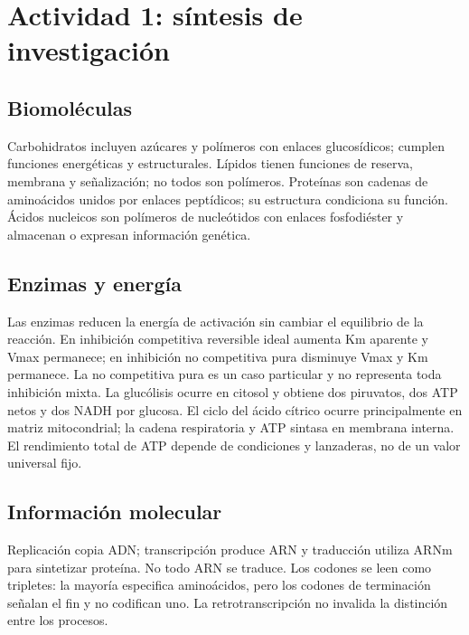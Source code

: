 \def\uadectitulo{Bioquímica y biología molecular}


\portadaUAdeC
\section{Actividad 1: síntesis de investigación}
\subsection{Biomoléculas}
Carbohidratos incluyen azúcares y polímeros con enlaces glucosídicos; cumplen funciones energéticas y estructurales. Lípidos tienen funciones de reserva, membrana y señalización; no todos son polímeros. Proteínas son cadenas de aminoácidos unidos por enlaces peptídicos; su estructura condiciona su función. Ácidos nucleicos son polímeros de nucleótidos con enlaces fosfodiéster y almacenan o expresan información genética.
\subsection{Enzimas y energía}
Las enzimas reducen la energía de activación sin cambiar el equilibrio de la reacción. En inhibición competitiva reversible ideal aumenta Km aparente y Vmax permanece; en inhibición no competitiva pura disminuye Vmax y Km permanece. La no competitiva pura es un caso particular y no representa toda inhibición mixta. La glucólisis ocurre en citosol y obtiene dos piruvatos, dos ATP netos y dos NADH por glucosa. El ciclo del ácido cítrico ocurre principalmente en matriz mitocondrial; la cadena respiratoria y ATP sintasa en membrana interna. El rendimiento total de ATP depende de condiciones y lanzaderas, no de un valor universal fijo.
\subsection{Información molecular}
Replicación copia ADN; transcripción produce ARN y traducción utiliza ARNm para sintetizar proteína. No todo ARN se traduce. Los codones se leen como tripletes: la mayoría especifica aminoácidos, pero los codones de terminación señalan el fin y no codifican uno. La retrotranscripción no invalida la distinción entre los procesos.
